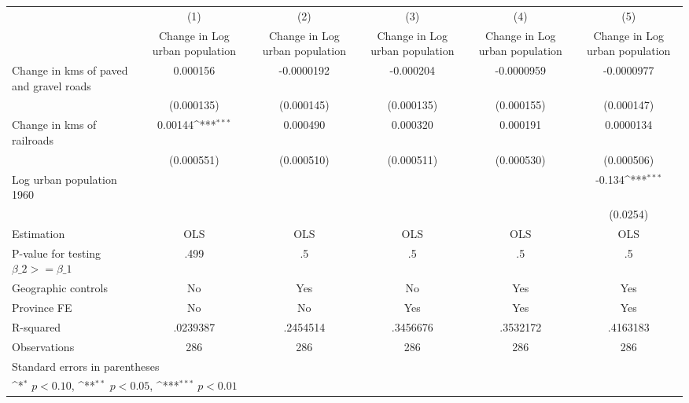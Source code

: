 {
\def\sym#1{\ifmmode^{#1}\else\(^{#1}\)\fi}
\begin{tabular}{l*{5}{c}}
\hline\hline
                    &\multicolumn{1}{c}{(1)}&\multicolumn{1}{c}{(2)}&\multicolumn{1}{c}{(3)}&\multicolumn{1}{c}{(4)}&\multicolumn{1}{c}{(5)}\\
                    &\multicolumn{1}{c}{Change in Log urban population}&\multicolumn{1}{c}{Change in Log urban population}&\multicolumn{1}{c}{Change in Log urban population}&\multicolumn{1}{c}{Change in Log urban population}&\multicolumn{1}{c}{Change in Log urban population}\\
\hline
Change in kms of paved and gravel roads&    0.000156         &  -0.0000192         &   -0.000204         &  -0.0000959         &  -0.0000977         \\
                    &  (0.000135)         &  (0.000145)         &  (0.000135)         &  (0.000155)         &  (0.000147)         \\
[1em]
Change in kms of railroads&     0.00144\sym{***}&    0.000490         &    0.000320         &    0.000191         &   0.0000134         \\
                    &  (0.000551)         &  (0.000510)         &  (0.000511)         &  (0.000530)         &  (0.000506)         \\
[1em]
Log urban population 1960&                     &                     &                     &                     &      -0.134\sym{***}\\
                    &                     &                     &                     &                     &    (0.0254)         \\
\hline
Estimation          &         OLS         &         OLS         &         OLS         &         OLS         &         OLS         \\
P-value for testing $\beta\_2 >= \beta\_1$&        .499         &          .5         &          .5         &          .5         &          .5         \\
Geographic controls &          No         &         Yes         &          No         &         Yes         &         Yes         \\
Province FE         &          No         &          No         &         Yes         &         Yes         &         Yes         \\
R-squared           &    .0239387         &    .2454514         &    .3456676         &    .3532172         &    .4163183         \\
Observations        &         286         &         286         &         286         &         286         &         286         \\
\hline\hline
\multicolumn{6}{l}{\footnotesize Standard errors in parentheses}\\
\multicolumn{6}{l}{\footnotesize \sym{*} \(p<0.10\), \sym{**} \(p<0.05\), \sym{***} \(p<0.01\)}\\
\end{tabular}
}
